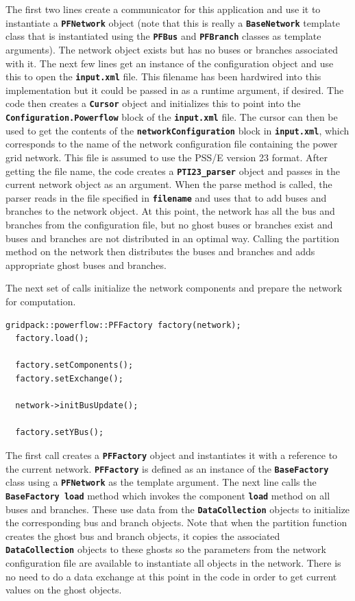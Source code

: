 \documentclass[12pt]{report} %
\begin{document}
The first two lines create a communicator for this application and use it to instantiate a \texttt{\textbf{PFNetwork}} object (note that this is really a \texttt{\textbf{BaseNetwork}} template class that is instantiated using the \texttt{\textbf{PFBus}} and \texttt{\textbf{PFBranch}} classes as template arguments). The network object exists but has no buses or branches associated with it. The next few lines get an instance of the configuration object and use this to open the \texttt{\textbf{input.xml}} file. This filename has been hardwired into this implementation but it could be passed in as a runtime argument, if desired. The code then creates a \texttt{\textbf{Cursor}} object and initializes this to point into the \texttt{\textbf{Configuration.Powerflow}} block of the \texttt{\textbf{input.xml}} file. The cursor can then be used to get the contents of the \texttt{\textbf{networkConfiguration}} block in \texttt{\textbf{input.xml}}, which corresponds to the name of the network configuration file containing the power grid network. This file is assumed to use the PSS/E version 23 format. After getting the file name, the code creates a \texttt{\textbf{PTI23\_parser}} object and passes in the current network object as an argument. When the parse method is called, the parser reads in the file specified in \texttt{\textbf{filename}} and uses that to add buses and branches to the network object. At this point, the network has all the bus and branches from the configuration file, but no ghost buses or branches exist and buses and branches are not distributed in an optimal way. Calling the partition method on the network then distributes the buses and branches and adds appropriate ghost buses and branches.

The next set of calls initialize the network components and prepare the network for computation.

{
\color{red}
\begin{Verbatim}[fontseries=b]
  gridpack::powerflow::PFFactory factory(network);
  factory.load();

  factory.setComponents();
  factory.setExchange();
  
  network->initBusUpdate();

  factory.setYBus();
\end{Verbatim}
}

The first call creates a \texttt{\textbf{PFFactory}} object and instantiates it with a reference to the current network. \texttt{\textbf{PFFactory}} is defined as an instance of the \texttt{\textbf{BaseFactory}} class using a \texttt{\textbf{PFNetwork}} as the template argument. The next line calls the \texttt{\textbf{BaseFactory load}} method which invokes the component \texttt{\textbf{load}} method on all buses and branches. These use data from the \texttt{\textbf{DataCollection}} objects to initialize the corresponding bus and branch objects. Note that when the partition function creates the ghost bus and branch objects, it copies the associated \texttt{\textbf{DataCollection}} objects to these ghosts so the parameters from the network configuration file are available to instantiate all objects in the network. There is no need to do a data exchange at this point in the code in order to get current values on the ghost objects.
\end{document}
